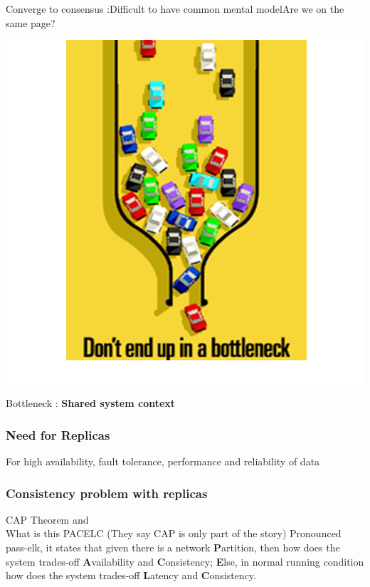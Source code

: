 \documentclass{beamer}
\begin{document}
	\begin{frame}{Converge to consensus :Difficult to have common mental model}{Are we on the same page?}

	\includegraphics[scale=0.1]{bottleneck.png}

	Bottleneck : \textbf{{\huge Shared system context}}

\end{frame}

\begin{frame}
	\frametitle{Need for Replicas}
	For high availability, fault tolerance, performance and reliability of data
\end{frame}

\begin{frame}
	\frametitle{Consistency problem with replicas}
	CAP Theorem  and \\
	What is this PACELC  (They say CAP is only part of the story)
	Pronounced pass-elk, it states that given there is a network \textbf{P}artition, then how does the system trades-off 	\textbf{A}vailability and \textbf{C}onsistency; \textbf{E}lse, in normal running condition how does the system trades-off 	\textbf{L}atency and \textbf{C}onsistency.

\end{frame}
\end{document}
